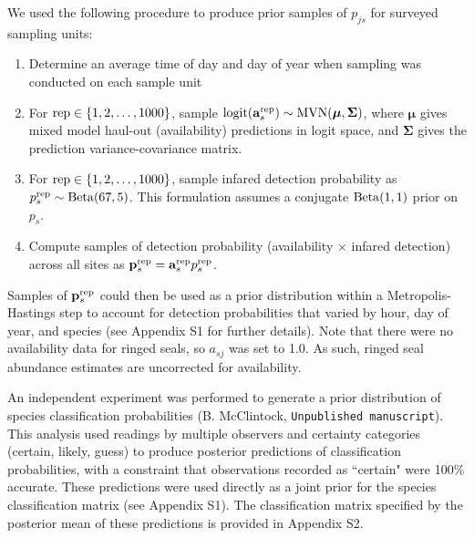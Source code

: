 \documentclass[12pt,fleqn]{article}
\begin{document}
\begin{flushleft}
\hspace{.5in}We used the following procedure to produce prior samples of $p_{js}$ for surveyed sampling units:
\begin{enumerate}
  \item Determine an average time of day and day of year when sampling was conducted on each sample unit
  \item For ${\rm rep} \in \{ 1,2,\hdots,1000 \}$, sample ${\rm logit}({\bf a}_s^{\rm rep}) \sim {\rm MVN}(\boldsymbol{\mu},\boldsymbol{\Sigma})$, where $\boldsymbol{\mu}$ gives mixed model haul-out (availability) predictions in logit space, and $\boldsymbol{\Sigma}$ gives the prediction variance-covariance matrix.
  \item For ${\rm rep} \in \{ 1,2,\hdots,1000 \}$, sample infared detection probability as $p^{\rm rep}_s \sim {\rm Beta}(67,5)$.  This formulation assumes a conjugate ${\rm Beta}(1,1)$ prior on $p_s$.
  \item Compute samples of detection probability (availability $\times$ infared detection) across all sites as ${\bf p}_{s}^{\rm rep}={\bf a}_s^{\rm rep} p_s^{\rm rep}$.
\end{enumerate}
Samples of ${\bf p}_{s}^{\rm rep}$ could then be used as a prior distribution within a Metropolis-Hastings step to account for detection probabilities that varied by hour, day of year, and species (see Appendix S1 for further details).  Note that there were no availability data for ringed seals,
so $a_{sj}$ was set to 1.0.  As such, ringed seal abundance estimates are uncorrected for availability.

\hspace{.5in}An independent experiment was performed to generate a prior distribution of species classification probabilities (B. McClintock, \texttt{Unpublished manuscript}).  This analysis used readings by multiple observers and certainty categories (certain, likely, guess) to produce posterior predictions of classification probabilities, with a constraint that observations recorded as ``certain" were 100\% accurate.  These predictions were used directly as a joint prior for the species classification matrix (see Appendix S1).  The classification matrix specified by the posterior mean of these predictions is provided in Appendix S2.


\end{flushleft}
\end{document}
